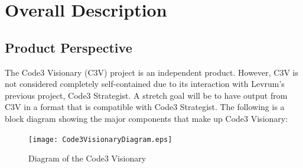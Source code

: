 \documentclass[onecolumn, draftclsnofoot,10pt, compsoc]{IEEEtran}
\begin{document}
\section{Overall Description}
    \subsection{Product Perspective}
    
    
    The Code3 Visionary (C3V) project is an independent product. 
    However, C3V is not considered completely self-contained due to its interaction with Levrum's previous project, Code3 Strategist.
    A stretch goal will be to have output from C3V in a format that is compatible with Code3 Strategist.
    The following is a block diagram showing the major components that make up Code3 Visionary:\\
    \begin{figure}[h!]
        \centering
        \texttt{[image: Code3VisionaryDiagram.eps]}
        \caption{Diagram of the Code3 Visionary}
        \label{fig:diagram}
    \end{figure}
    
\end{document}
